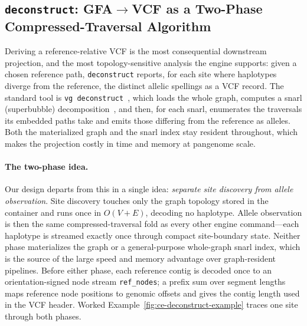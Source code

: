 \subsection{\texttt{deconstruct}: GFA$\rightarrow$VCF as a Two-Phase Compressed-Traversal Algorithm}\label{subsec:ce-deconstruct}

Deriving a reference-relative VCF is the most consequential downstream projection,
and the most topology-sensitive analysis the engine supports: given a chosen
reference path, \texttt{deconstruct} reports, for each site where haplotypes diverge
from the reference, the distinct allelic spellings as a VCF record. The standard
tool is \texttt{vg deconstruct}~\cite{garrison2018variation}, which loads the whole
graph, computes a snarl (superbubble) decomposition~\cite{paten2018superbubbles},
and then, for each snarl, enumerates the traversals its embedded paths take and
emits those differing from the reference as alleles. Both the materialized graph and
the snarl index stay resident throughout, which makes the projection costly in time
and memory at pangenome scale.

\paragraph{The two-phase idea.}
Our design departs from this in a single idea: \emph{separate site discovery from
allele observation}. Site discovery touches only the graph topology stored in the
container and runs once in $O(V+E)$, decoding no haplotype. Allele observation is
then the same compressed-traversal fold as every other engine command---each
haplotype is streamed exactly once through compact site-boundary state. Neither
phase materializes the graph or a general-purpose whole-graph snarl index, which is
the source of the large speed and memory advantage over graph-resident pipelines.
Before either phase, each reference contig is decoded once to an orientation-signed
node stream \texttt{ref\_nodes}; a prefix sum over segment lengths maps reference
node positions to genomic offsets and gives the contig length used in the VCF
header. Worked Example~\ref{fig:ce-deconstruct-example} traces one site through both
phases.

